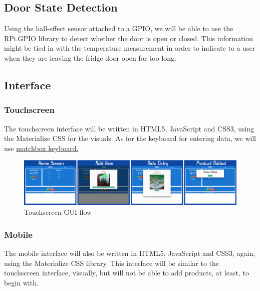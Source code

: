 \documentclass[10pt]{article}
\begin{document}
\subsection{Door State Detection}

Using the hall-effect sensor attached to a GPIO, we will be able to use the RPi.GPIO library to detect whether the door is open or closed. This information might be tied in with the temperature measurement in order to indicate to a user when they are leaving the fridge door open for too long.

\subsection{Interface}

\subsubsection{Touchscreen}
The touchscreen interface will be written in HTML5, JavaScript and CSS3, using the Materialize CSS for the visuals. As for the keyboard for entering data, we will use \href{https://github.com/xlab/matchbox-keyboard}{matchbox keyboard.}

\begin{figure}[h]
\centering
\caption{Touchscreen GUI flow}
\label{Touchscreen GUI flow}
\includegraphics[width=18cm]{images/GUI-flow.png}
\end{figure}


\subsubsection{Mobile}

The mobile interface will also be written in HTML5, JavaScript and CSS3, again, using the Materialize CSS library. This interface will be similar to the touchscreen interface, visually, but will not be able to add products, at least, to begin with.
\end{document}
